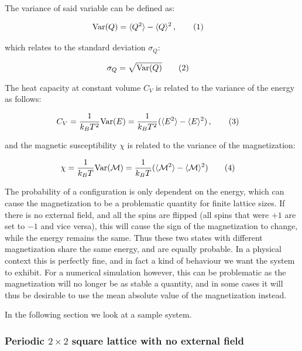\documentclass[reprint,english,notitlepage]{revtex4-1}  %
\newcommand\numberthis{\addtocounter{equation}{1}\tag{\theequation}}
\begin{document}
The variance of said variable can be defined as:

\begin{align*}
\text{Var}(Q) &= \langle Q^2 \rangle - \langle Q \rangle^2 \, , \numberthis \label{eq:variance} 
\end{align*}

which relates to the standard deviation $\sigma_Q$:

\begin{align*}
\sigma_Q &= \sqrt{\text{Var}(Q)} \numberthis \label{eq:standard_deviation}
\end{align*}

The heat capacity at constant volume $C_V$ is related to the variance of the energy as follows:

\begin{align*}
C_V &= \frac{1}{k_B T^2} \text{Var}(E) = \frac{1}{k_B T^2} (\langle E^2 \rangle - \langle E \rangle^2) \, ,\numberthis \label{eq:heat_capacity}
\end{align*}

and the magnetic susceptibility $\chi$ is related to the variance of the magnetization:

\begin{align*}
\chi &= \frac{1}{k_B T} \text{Var}(\mathcal{M}) = \frac{1}{k_B T} ( \langle \mathcal{M}^2 \rangle - \langle \mathcal{M} \rangle^2) \numberthis \label{eq:magnetic_susceptibility}
\end{align*}

The probability of a configuration is only dependent on the energy, which can cause the magnetization to be a problematic quantity for finite lattice sizes. If there is no external field, and all the spins are flipped (all spins that were $+1$ are set to $-1$ and vice versa), this will cause the sign of the magnetization to change, while the energy remains the same. Thus these two states with different magnetization share the same energy, and are equally probable. In a physical context this is perfectly fine, and in fact a kind of behaviour we want the system to exhibit. For a numerical simulation however, this can be problematic as the magnetization will no longer be as stable a quantity, and in some cases it will thus be desirable to use the mean absolute value of the magnetization instead.


In the following section we look at a sample system.


\subsubsection{Periodic \( 2 \times 2 \) square lattice with no external field} \label{sec:II:A:i}
\end{document}
